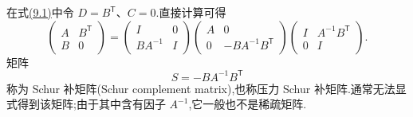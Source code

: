 \begin{note}
\label{note:chapter9-schur-complement}
在式\hyperref[eq:chapter9-coupled-system]{(9.1)}中令 $D=B^{\mathsf T}$、$C=0$.直接计算可得
\begin{equation}\label{eq:chapter9-system-factorization}
\begin{pmatrix}A&B^{\mathsf T}\\B&0\end{pmatrix}
=
\begin{pmatrix}I&0\\BA^{-1}&I\end{pmatrix}
\begin{pmatrix}A&0\\0&-BA^{-1}B^{\mathsf T}\end{pmatrix}
\begin{pmatrix}I&A^{-1}B^{\mathsf T}\\0&I\end{pmatrix}.
\end{equation}
矩阵
\begin{equation}\label{eq:chapter9-schur-complement}
S=-BA^{-1}B^{\mathsf T}
\end{equation}
称为 Schur 补矩阵(Schur complement matrix),也称压力 Schur 补矩阵.通常无法显式得到该矩阵;由于其中含有因子 $A^{-1}$,它一般也不是稀疏矩阵.
\end{note}


